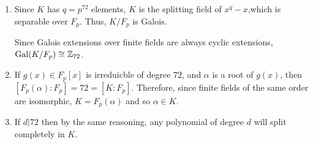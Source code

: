 \documentclass[12pt]{AlgebraQual}
\begin{document}
\begin{solution}$\,$
\begin{enumerate}[label=(\alph*)]
    \item Since $K$ has $q=p^{72}$ elements, $K$ is the splitting field of $x^q-x$,which is separable over $F_p$. Thus, $K/F_p$ is Galois.

    Since Galois extensions over finite fields are always cyclic extensions, $\text{Gal}(K/F_p)\cong\mathbb{Z}_{72}$.

    \item If $g(x)\in F_p[x]$ is irreduicble of degree $72$, and $\alpha$ is a root of $g(x)$, then $[F_p(\alpha):F_p]=72=[K:F_p]$. Therefore, since finite fields of the same order are isomorphic, $K=F_p(\alpha)$ and so $\alpha\in K.$

    \item If $d|72$ then by the same reasoning, any polynomial of degree $d$ will split completely in $K$.
\end{enumerate}
\end{solution}
\newpage
\end{document}
